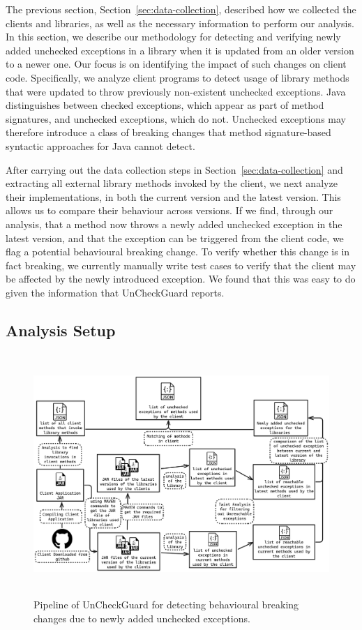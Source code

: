 The previous section, Section~\ref{sec:data-collection}, described how we collected the clients and libraries, as well as the necessary information to perform our analysis.
In this section, we describe our methodology for detecting and verifying newly added unchecked exceptions in a library when it is updated from an older version to a newer one. Our focus is on identifying the impact of such changes on client code. Specifically, we analyze client programs to detect usage of library methods that were updated to throw previously non-existent unchecked exceptions. Java distinguishes between checked exceptions, which appear as part of method signatures, and unchecked exceptions, which do not. Unchecked exceptions may therefore introduce a class of breaking changes that method signature-based syntactic approaches for Java cannot detect.

After carrying out the data collection steps in Section~\ref{sec:data-collection} and extracting all external library methods invoked by the client, we next analyze their implementations, in both the current version and the latest version. This allows us to compare their behaviour across versions. If we find, through our analysis, that a method now throws a newly added unchecked exception in the latest version, and that the exception can be triggered from the client code, we flag a potential behavioural breaking change. To verify whether this change is in fact breaking, we currently manually write test cases to verify that the client may be affected by the newly introduced exception. We found that this was easy to do given the information that UnCheckGuard reports.

\subsection{Analysis Setup}

\begin{figure}[hbt!]
    \centering
    \includegraphics[height=260pt]{diagram/finalfpioeline.png}
    \caption{Pipeline of UnCheckGuard for detecting behavioural breaking changes due to newly added unchecked exceptions.}
    \label{fig:jsonjava}
\end{figure}

